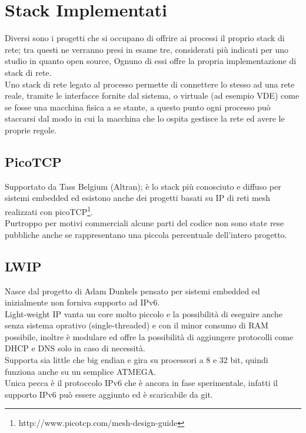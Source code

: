 \section{Stack Implementati}
Diversi sono i progetti che si occupano di offrire ai processi il proprio stack di rete; tra questi ne verranno presi in esame tre, considerati pi\`u indicati per uno studio in quanto open source, Ognuno di essi offre la propria implementazione di stack di rete.\\
Uno stack di rete legato al processo permette di connettere lo stesso ad una rete reale, tramite le interfacce fornite dal sistema, o virtuale (ad esempio VDE) come se fosse una macchina fisica a se stante, a questo punto ogni processo pu\`o staccarsi dal modo in cui la macchina che lo ospita gestisce la rete ed avere le proprie regole.\\

\subsection{PicoTCP}
Supportato da Tass Belgium (Altran); \`e lo stack pi\`u conosciuto e diffuso per sistemi embedded ed esistono anche dei progetti basati su IP di reti mesh realizzati con picoTCP\footnote{http://www.picotcp.com/mesh-design-guide}.\\
Purtroppo per motivi commerciali alcune parti del codice non sono state rese pubbliche anche se rappresentano una piccola percentuale dell'intero progetto.
\subsection{LWIP}
Nasce dal progetto di Adam Dunkels pensato per sistemi embedded ed inizialmente non forniva supporto ad IPv6.\\
Light-weight IP vanta un core molto piccolo e la possibilit\`a di eseguire anche senza sistema oprativo (single-threaded) e con il minor consumo di RAM possibile, inoltre \`e modulare ed offre la possibilit\`a di aggiungere protocolli come DHCP e DNS solo in caso di necessit\`a.\\
Supporta sia little che big endian e gira su processori a 8 e 32 bit, quindi funziona anche su un semplice ATMEGA.\\
Unica pecca \`e il protoccolo IPv6 che \`e ancora in fase sperimentale, infatti il supporto IPv6 pu\`o essere aggiunto ed \`e scaricabile da git.
